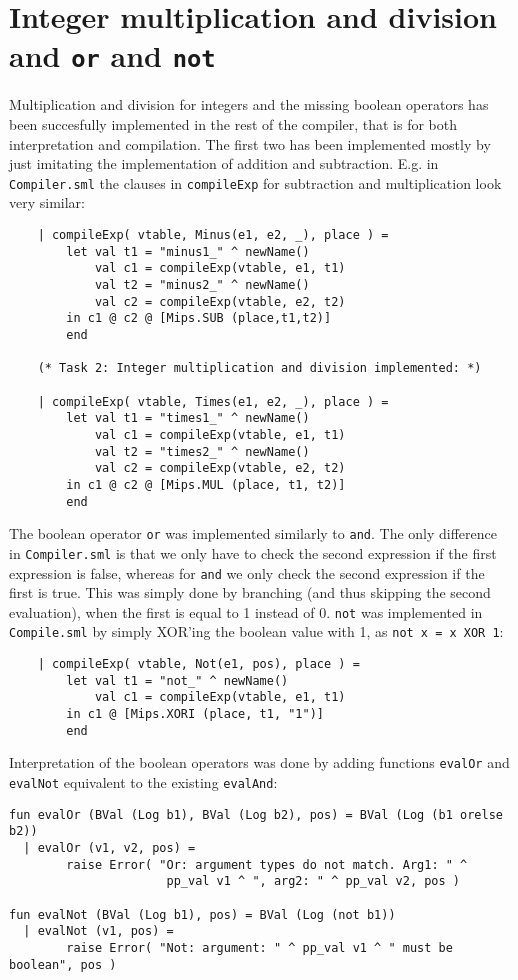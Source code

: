 \documentclass{article}
\begin{document}
\section{Integer multiplication and division and \texttt{or} and \texttt{not}}
Multiplication and division for integers and the missing boolean operators has been succesfully implemented in the rest of the compiler, that is for both interpretation and compilation. The first two has been implemented mostly by just imitating the implementation of addition and subtraction. E.g. in \texttt{Compiler.sml} the clauses in \texttt{compileExp} for subtraction and multiplication look very similar:
\begin{lstlisting}
    | compileExp( vtable, Minus(e1, e2, _), place ) =
        let val t1 = "minus1_" ^ newName()
            val c1 = compileExp(vtable, e1, t1)
            val t2 = "minus2_" ^ newName()
            val c2 = compileExp(vtable, e2, t2)
        in c1 @ c2 @ [Mips.SUB (place,t1,t2)]
        end

    (* Task 2: Integer multiplication and division implemented: *)

    | compileExp( vtable, Times(e1, e2, _), place ) =
        let val t1 = "times1_" ^ newName()
            val c1 = compileExp(vtable, e1, t1)
            val t2 = "times2_" ^ newName()
            val c2 = compileExp(vtable, e2, t2)
        in c1 @ c2 @ [Mips.MUL (place, t1, t2)]
        end
\end{lstlisting}
The boolean operator \texttt{or} was implemented similarly to \texttt{and}. The only difference in \texttt{Compiler.sml} is that we only have to check the second expression if the first expression is false, whereas for \texttt{and} we only check the second expression if the first is true. This was simply done by branching (and thus skipping the second evaluation), when the first is equal to 1 instead of 0.\newline
\texttt{not} was implemented in \texttt{Compile.sml} by simply XOR'ing the boolean value with 1, as \texttt{not x = x XOR 1}:
\begin{lstlisting}
    | compileExp( vtable, Not(e1, pos), place ) =
        let val t1 = "not_" ^ newName()
            val c1 = compileExp(vtable, e1, t1)
        in c1 @ [Mips.XORI (place, t1, "1")]
        end
\end{lstlisting}
Interpretation of the boolean operators was done by adding functions \texttt{evalOr} and \texttt{evalNot} equivalent to the existing \texttt{evalAnd}:
\begin{lstlisting}
fun evalOr (BVal (Log b1), BVal (Log b2), pos) = BVal (Log (b1 orelse b2))
  | evalOr (v1, v2, pos) =
        raise Error( "Or: argument types do not match. Arg1: " ^
                      pp_val v1 ^ ", arg2: " ^ pp_val v2, pos )

fun evalNot (BVal (Log b1), pos) = BVal (Log (not b1))
  | evalNot (v1, pos) =
        raise Error( "Not: argument: " ^ pp_val v1 ^ " must be boolean", pos )
\end{lstlisting}
\end{document}
